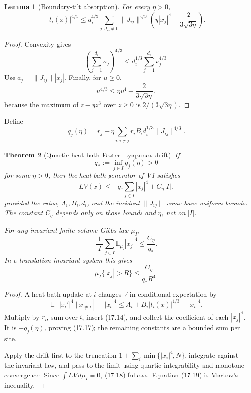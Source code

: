 \documentclass[11pt]{article}
\newtheorem{theorem}{Theorem}[section]
\newtheorem{lemma}[theorem]{Lemma}
\theoremstyle{remark}
\begin{document}
\begin{lemma}[Boundary-tilt absorption]
\label{lem:v15v17-absorption}
For every \(\eta>0\),
\[
 |t_i(x)|^{4/3}
 \le
 d_i^{1/3}\sum_{j:J_{ij}\ne0}
 \|J_{ij}\|^{4/3}
 \left(
 \eta |x_j|^4+\frac{2}{3\sqrt{3\eta}}
 \right).                                                   \tag{17.14}
\]
\end{lemma}

\begin{proof}
Convexity gives
\[
 \left(\sum_{j=1}^{d_i}a_j\right)^{4/3}
 \le d_i^{1/3}\sum_{j=1}^{d_i}a_j^{4/3}.
\]
Use \(a_j=\|J_{ij}\||x_j|\).  Finally, for \(u\ge0\),
\[
 u^{4/3}\le\eta u^4+\frac{2}{3\sqrt{3\eta}},
\]
because the maximum of \(z-\eta z^3\) over \(z\ge0\) is
\(2/(3\sqrt{3\eta})\).
\end{proof}

Define
\[
 q_j(\eta)
 =
 r_j-\eta\sum_{i:i\ne j}
 r_iB_i d_i^{1/3}\|J_{ij}\|^{4/3}.                          \tag{17.15}
\]

\begin{theorem}[Quartic heat-bath Foster--Lyapunov drift]
\label{thm:v15v17-drift}
If
\[
 q_*:=\inf_{j\in I}q_j(\eta)>0                              \tag{17.16}
\]
for some \(\eta>0\), then the heat-bath generator of V1 satisfies
\[
 \boxed{
 LV(x)
 \le
 -q_*\sum_{j\in I}|x_j|^4+C_\eta |I|,}                     \tag{17.17}
\]
provided the rates, \(A_i,B_i,d_i\), and the incident
\(\|J_{ij}\|\) sums have uniform bounds.  The constant
\(C_\eta\) depends only on those bounds and \(\eta\), not on
\(|I|\).

For any invariant finite-volume Gibbs law \(\mu_I\),
\[
 \frac1{|I|}\sum_{j\in I}\mathbb E_{\mu_I}|x_j|^4
 \le\frac{C_\eta}{q_*}.                                     \tag{17.18}
\]
In a translation-invariant system this gives
\[
 \mu_I\{|x_j|>R\}
 \le\frac{C_\eta}{q_*R^4}.                                  \tag{17.19}
\]
\end{theorem}

\begin{proof}
A heat-bath update at \(i\) changes \(V\) in conditional
expectation by
\[
 \mathbb E[|x_i'|^4\mid x_{\ne i}]-|x_i|^4
 \le A_i+B_i|t_i(x)|^{4/3}-|x_i|^4.                         \tag{17.20}
\]
Multiply by \(r_i\), sum over \(i\), insert (17.14), and collect the
coefficient of each \(|x_j|^4\).  It is
\(-q_j(\eta)\), proving (17.17); the remaining constants are a
bounded sum per site.

Apply the drift first to the truncation
\(1+\sum_i\min\{|x_i|^4,N\}\), integrate against the invariant law,
and pass to the limit using quartic integrability and monotone
convergence.  Since \(\int LV\,d\mu_I=0\), (17.18) follows.
Equation (17.19) is Markov's inequality.
\end{proof}
\end{document}
